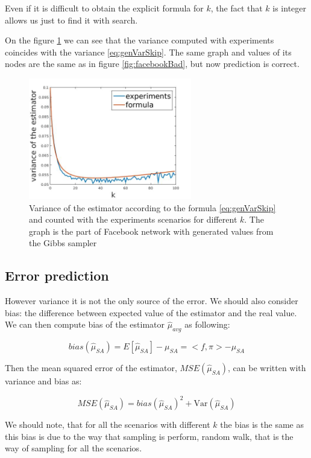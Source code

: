 \documentclass[12pt]{report}
\begin{document}
Even if it is difficult to obtain the explicit formula for $k$, the fact that $k$ is integer allows us just to find it with search.

On the figure \ref{fig:facebookGood} we can see that the variance computed with experiments coincides with the variance \ref{eq:genVarSkip}. The same graph and values of its nodes are the same as in figure \ref{fig:facebookBad}, but now prediction is correct.

\begin{figure}[ht]
    \centering
    \includegraphics[height=200px]{facebookGood}
    \caption{Variance of the estimator according to the formula \ref{eq:genVarSkip} and counted with the experiments scenarios for different $k$. The graph is the part of Facebook network \cite{Facebook} with generated values from the Gibbs sampler}
    \label{fig:facebookGood}
\end{figure}


\subsection{Error prediction}

However variance it is not the only source of the error. We should also consider bias: the difference between expected value of the estimator and the real value. We can then compute bias of the estimator $\hat{\mu}_{avg}$ as following:

$$bias(\hat{\mu}_{SA}) = E[\hat{\mu}_{SA}] - \mu_{SA} = <f, \pi> - \mu_{SA}$$

Then the mean squared error of the estimator, $MSE(\hat{\mu}_{SA})$, can be written with variance and bias as: 

$$MSE(\hat{\mu}_{SA}) = bias(\hat{\mu}_{SA})^2 + \mathrm{Var}(\hat{\mu}_{SA})$$

We should note, that for all the scenarios with different $k$ the bias is the same as this bias is due to the way that sampling is perform, random walk, that is the way of sampling for all the scenarios.
\end{document}
